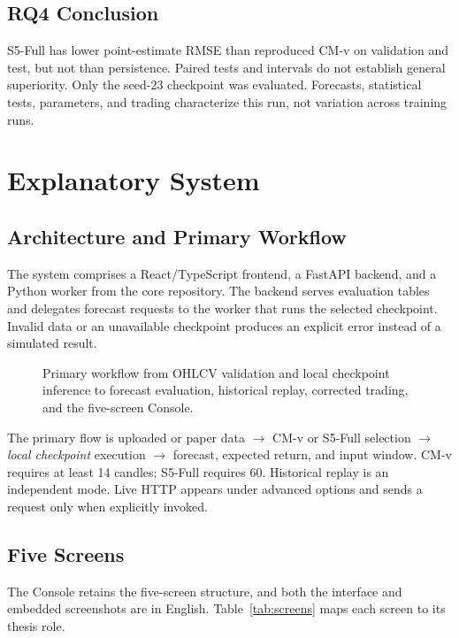 \documentclass[13pt,a4paper,oneside]{report}
\begin{document}
\section{RQ4 Conclusion}\label{sec:s5-conclusion}
\enlargethispage{2\baselineskip}
S5-Full has lower point-estimate RMSE than reproduced CM-v on validation and test, but not than
persistence. Paired tests and intervals do not establish general superiority. Only the seed-23
checkpoint was evaluated. Forecasts, statistical tests, parameters, and trading characterize this
run, not variation across training runs.

\chapter{Explanatory System}\label{chap:system}

\section{Architecture and Primary Workflow}\label{sec:system-flow}
The system comprises a React/TypeScript frontend, a FastAPI backend, and a Python worker from the
core repository. The backend serves evaluation tables and delegates forecast requests to the worker
that runs the selected checkpoint. Invalid data or an unavailable checkpoint produces an explicit
error instead of a simulated result.

\begin{figure}[htbp]
\centering
\resizebox{\linewidth}{!}{}
\caption[System workflow]{Primary workflow from OHLCV validation and local checkpoint inference to
forecast evaluation, historical replay, corrected trading, and the five-screen Console.}
\label{fig:system-flow}
\end{figure}

The primary flow is uploaded or paper data $\to$ CM-v or S5-Full selection $\to$
\emph{local checkpoint} execution $\to$ forecast, expected return, and input window.
CM-v requires at least 14 candles; S5-Full requires 60. Historical replay is an independent mode.
Live HTTP appears under advanced options and sends a request only when explicitly invoked.

\section{Five Screens}\label{sec:five-screens}
The Console retains the five-screen structure, and both the interface and embedded screenshots are
in English. Table~\ref{tab:screens} maps each screen to its thesis role.
\end{document}
